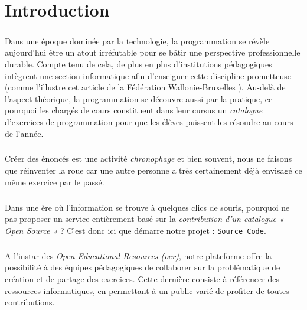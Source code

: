 \chapter{Introduction}

\paragraph{} Dans une époque dominée par la technologie, la programmation se révèle aujourd’hui être un atout irréfutable pour se bâtir une perspective professionnelle durable. Compte tenu de cela, de plus en plus d’institutions pédagogiques intègrent une section informatique afin d’enseigner cette discipline prometteuse (comme l'illustre cet article de la Fédération Wallonie-Bruxelles \cite{MAG_PROG}). Au-delà de l’aspect théorique, la programmation se découvre aussi par la pratique, ce pourquoi les chargés de cours constituent dans leur cursus un \textit{catalogue} d’exercices de programmation pour que les élèves puissent les résoudre au cours de l'année. 

\paragraph{} Créer des énoncés est une activité \textit{chronophage} et bien souvent, nous ne faisons que réinventer la roue car une autre personne a très certainement déjà envisagé ce même exercice par le passé.

\paragraph{} Dans une ère où l’information se trouve à quelques clics de souris, pourquoi ne pas proposer un service entièrement basé sur la \textit{contribution d’un catalogue « Open Source »} ? C’est donc ici que démarre notre projet : \texttt{Source Code}.

\paragraph{} A l’instar des \textit{Open Educational Resources (\Gls{oer})}, notre plateforme offre la possibilité à des équipes pédagogiques de collaborer sur la problématique de création et de partage des exercices. Cette dernière consiste à référencer des ressources informatiques, en permettant à un public varié de profiter de toutes contributions. 